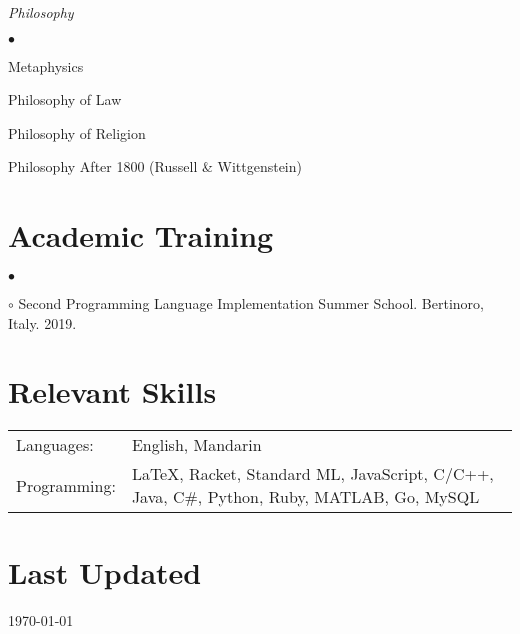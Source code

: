\documentclass[margin,line]{res}
\newenvironment{list2}{
  \begin{list}{$\bullet$}{%
      \setlength{\itemsep}{0in}
      \setlength{\parsep}{0in} \setlength{\parskip}{0in}
      \setlength{\topsep}{0in} \setlength{\partopsep}{0in}
      \setlength{\leftmargin}{0.2in}}}{\end{list}}
\begin{document}
\begin{resume}
\emph{Philosophy}
\begin{list2}
  \item[] Metaphysics
  \item[] Philosophy of Law
  \item[] Philosophy of Religion
  \item[] Philosophy After 1800 (Russell \& Wittgenstein)
\end{list2}


\section{\sc Academic Training}

\begin{list2}
\item[$\circ$] Second Programming Language Implementation Summer School. Bertinoro, Italy. 2019.
\end{list2}


\section{\sc Relevant Skills}

\vspace{.05in}
\begin{tabular}{@{}p{0.8in}p{4.25in}}

Languages:& English, Mandarin \\
Programming:& \LaTeX, Racket, Standard ML, JavaScript, C/C++, Java, C\#, Python, Ruby, MATLAB, Go, MySQL

\end{tabular}


\section{\sc Last Updated}
\today


\end{resume}
\end{document}
